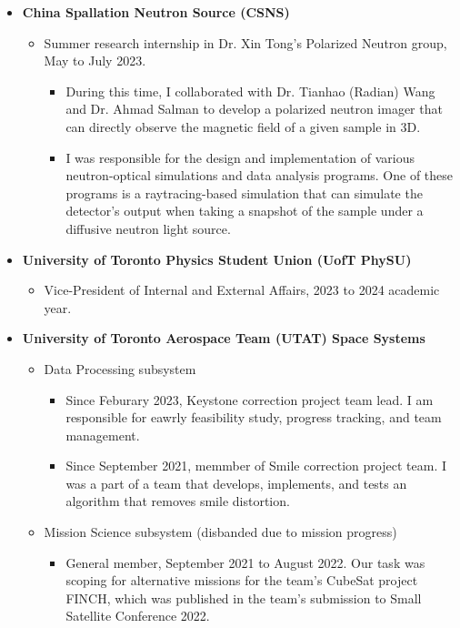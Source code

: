 \documentclass{article}
\begin{document}
\begin{itemize}
    \item \textbf{China Spallation Neutron Source (CSNS)}
    \begin{itemize}
        \item Summer research internship in Dr. Xin Tong's Polarized Neutron group, May to July 2023. 
        \begin{itemize}
            \item During this time, I collaborated with Dr. Tianhao (Radian) Wang and Dr. Ahmad Salman to develop a polarized neutron imager that can directly observe the magnetic field of a given sample in 3D.
            \item I was responsible for the design and implementation of various neutron-optical simulations and data analysis programs. One of these programs is a raytracing-based simulation that can simulate the detector's output when taking a snapshot of the sample under a diffusive neutron light source.
        \end{itemize}
    \end{itemize}
    \item \textbf{University of Toronto Physics Student Union (UofT PhySU)}
    \begin{itemize}
        \item Vice-President of Internal and External Affairs, 2023 to 2024 academic year.
    \end{itemize}
    \item \textbf{University of Toronto Aerospace Team (UTAT) Space Systems}
    \begin{itemize}
        \item Data Processing subsystem
        \begin{itemize}
            \item Since Feburary 2023, Keystone correction project team lead. I am responsible for eawrly feasibility study, progress tracking, and team management.
            \item Since September 2021, memmber of Smile correction project team. I was a part of a team that develops, implements, and tests an algorithm that removes smile distortion.
        \end{itemize}

        \item Mission Science subsystem (disbanded due to mission progress)
        \begin{itemize}
            \item General member, September 2021 to August 2022. Our task was scoping for alternative missions for the team's CubeSat project FINCH, which was published in the team's submission to Small Satellite Conference 2022.
        \end{itemize} 
    \end{itemize}


\end{itemize}
\end{document}
